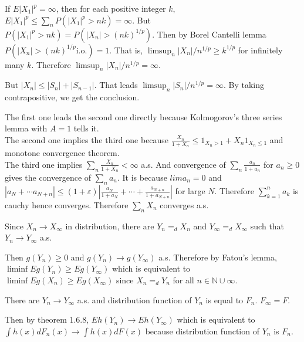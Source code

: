 \begin{problem}[2.5.2] \hfill

	If $E|X_1|^p = \infty$, then for each positive integer $k$, $E|X_1|^p \leq \sum_{n} P(|X_1|^p > nk) = \infty$.
	But $P(|X_1|^p > nk) = P(|X_n| > (nk)^{1/p} )$. Then by Borel Cantelli lemma $P(|X_n| > (nk)^{1/p} \text{i.o.} ) =1$. That is, $\limsup_{n} |X_n| / n^{1/p} \geq k^{1/p}$ for infinitely many $k$. Therefore $\limsup_n |X_n|/n^{1/p} = \infty$.

	But $|X_n| \leq |S_n| + |S_{n-1}|$. That leads $\limsup_n |S_n| / n^{1/p} = \infty$. By taking contrapositive, we get the conclusion.

\end{problem}

\begin{problem}[2.5.5] \hfill

	The first one leads the second one directly because Kolmogorov's three series lemma with $A=1$ tells it. \\

	The second one implies the third one because $\frac{X_n}{1+X_n} \leq 1_{X_n >1} + X_n 1_{X_n \leq 1}$ and monotone convergence theorem. \\

	The third one implies $\sum_n \frac{X_n}{1+X_n} < \infty$ a.s. And convergence of $\sum_n \frac{a_n}{1+a_n}$ for $a_n \geq 0$ gives the convergence of $\sum_n a_n$. It is because $lim a_n = 0$ and $|a_N + \cdots a_{N+n}| \leq (1+\varepsilon) \left | \frac{a_N}{1+a_N} + \cdots + \frac{a_{N+n}}{1+a_{N+n}} \right |$ for large $N$. Therefore $\sum_{k=1}^{n}a_k$ is cauchy hence converges.
	Therefore $\sum_n X_n$ converges a.s.
\end{problem}

\begin{problem}[3.2.4] \hfill

	Since $X_n \rightarrow X_\infty$ in distribution, there are $Y_n =_d X_n$ and $Y_\infty =_d X_\infty$ such that $Y_n \rightarrow Y_\infty$ a.s.
	
	Then $g(Y_n) \geq 0$ and $g(Y_n) \rightarrow g(Y_\infty)$ a.s. Therefore by Fatou's lemma, $\liminf Eg(Y_n) \geq Eg(Y_\infty)$ which is equivalent to $\liminf Eg(X_n) \geq Eg(X_\infty)$ since $X_n =_d Y_n$ for all $n \in \mathbb{N} \cup \infty$.
\end{problem}

\begin{problem}[3.2.5] \hfill

	There are $Y_n \rightarrow Y_\infty$ a.s. and distribution function of $Y_n$ is equal to $F_n$. $F_\infty = F$.

	Then by theorem 1.6.8, $Eh(Y_n) \rightarrow Eh(Y_\infty)$ which is equivalent to $\int h(x) dF_n(x) \rightarrow \int h(x) dF(x)$ because distribution function of $Y_n$ is $F_n$.
	
\end{problem}
